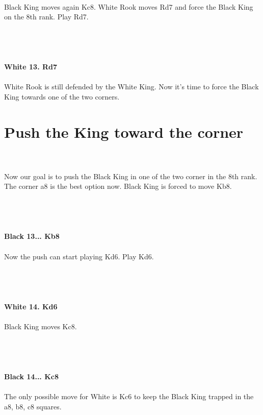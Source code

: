 \documentclass{article}
\begin{document}
\\
Black King moves again Kc8. White Rook moves Rd7 and force the Black King on the 8th rank. Play Rd7.\\\\
\\

\\
\\
\textbf{White 13. Rd7}\\
\\
White Rook is still defended by the White King. Now it's time to force the Black King towards one of the two corners.\\\section{ Push the King toward the corner}

\\
\\
Now our goal is to push the Black King in one of the two corner in the 8th rank. The corner a8 is the best option now. Black King is forced to move Kb8.\\\\
\\

\\
\\
\textbf{Black 13... Kb8}\\
\\
Now the push can start playing Kd6. Play Kd6.\\\\
\\

\\
\\
\textbf{White 14. Kd6}\\
\\
Black King moves Kc8.\\\\
\\

\\
\\
\textbf{Black 14... Kc8}\\
\\
The only possible move for White is Kc6 to keep the Black King trapped in the a8, b8, c8 squares.\\\\
\end{document}
